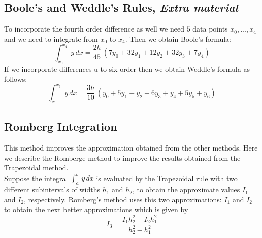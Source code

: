 \documentclass[aima203_lecturenotes_ku.tex]{subfiles}
\begin{document}
\subsection{Boole's and Weddle's Rules, \textit{Extra material}}
To incorporate the fourth order difference as well we need $5$ data points $x_0, ..., x_4$ and we need to integrate from $x_0$ to $x_4$. Then we obtain Boole's formula:
\begin{equation}
  \label{Boole's}
  \displaystyle \int_{x_0}^{x_4} \; y\,dx = \frac{2h}{45}\, (7y_0 + 32y_1 + 12y_2+32y_3+7y_4)
\end{equation}
If we incorporate differences u to six order then we obtain Weddle's formula as follows:
\begin{equation}
  \label{Weddle's}
  \displaystyle \int_{x_0}^{x_6} \; y\,dx = \frac{3h}{10}\, (y_0 + 5y_1 + y_2+6y_3+y_4+5y_5+y_6)
\end{equation}

\subsection{Romberg Integration}
This method improves the approximation obtained from the other methods. Here we describe the Romberge method to improve the results obtained from the Trapezoidal method. \\[2mm]
Suppose the integral $\displaystyle \int_a^b \, y\,dx$ is evaluated by the Trapezoidal rule with two different subintervals of widths $h_1$ and $h_2$, to obtain the approximate values $I_1$ and $I_2$, respectively. Romberg's method uses this two approximations: $I_1$ and $I_2$ to obtain the next better approximations which is given by
\begin{equation}
  \label{romberg}
I_3 = \frac{I_1h_2^2-I_2h_1^2}{h_2^2 - h_1^2}
\end{equation}
\end{document}
